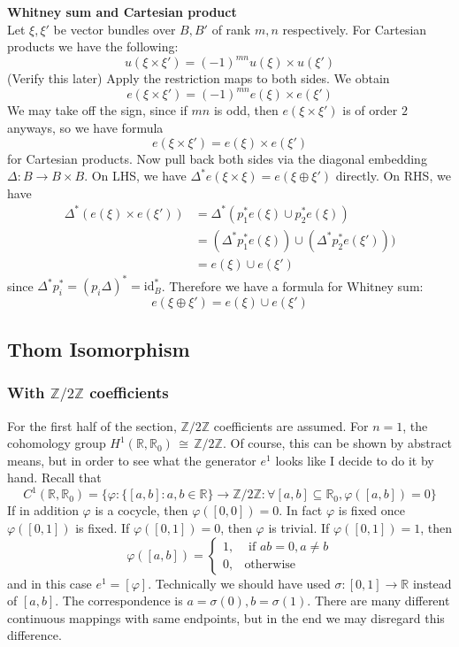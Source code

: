 \documentclass[12pt]{article}
\theoremstyle{plain}
\theoremstyle{definition}
\newcommand{\IR}{\mathbb{R}}
\newcommand{\IZ}{\mathbb{Z}}
\newcommand\iso{\,{\cong}\,}
\newcommand{\<}{\langle}
\renewcommand{\>}{\rangle}
\newcommand{\id}{\mathrm{id}}
\begin{document}
\textbf{Whitney sum and Cartesian product}\\
Let $\xi, \xi'$ be vector bundles over $B, B'$ of rank $m, n$ respectively. 
For Cartesian products we have the following:
$$ u(\xi \times \xi') = (-1)^{mn} u(\xi) \times u(\xi') $$ (Verify this later)
Apply the restriction maps to both sides. We obtain 
$$ e(\xi \times \xi') = (-1)^{mn} e(\xi) \times e(\xi')$$
We may take off the sign, since if $mn$ is odd, then $e(\xi \times \xi')$ is of order $2$ anyways, so we have formula
$$ e(\xi \times \xi') = e(\xi) \times e(\xi')$$
for Cartesian products. Now pull back both sides via the diagonal embedding $\Delta : B \to B \times B$. On LHS, we have $\Delta^* e(\xi \times \xi) = e (\xi \oplus \xi')$ directly. On RHS, we have 
\begin{align*}
\Delta^*(e(\xi) \times e(\xi')) & = \Delta^*( p_1^* e(\xi) \cup p_2^* e(\xi))\\
&= (\Delta^* p_1^* e(\xi) ) \cup (\Delta^* p_2^* e(\xi'))) \\
&= e(\xi) \cup e(\xi') 
\end{align*}
since $\Delta^* p_i^* = (p_i \Delta)^* = \id_B^*$. Therefore we have a formula for Whitney sum:
$$ e(\xi \oplus \xi') = e(\xi) \cup e(\xi')$$


\subsection{Thom Isomorphism}
\subsubsection{With $\IZ/2\IZ$ coefficients}
For the first half of the section, $\IZ/2\IZ$ coefficients are assumed.
For $n = 1$, the cohomology group $H^1(\IR, \IR_0) \iso \IZ/2\IZ$. Of course, this can be shown by abstract means, but in order to see what the generator $e^1$ looks like I decide to do it by hand. Recall that $$C^1(\IR, \IR_0)= \{ \varphi : \{ [a, b]: a, b \in \IR \} \to \IZ/2\IZ : \forall [a, b] \subseteq \IR_0, \varphi([a, b]) = 0 \}$$ If in addition $\varphi$ is a cocycle, then $\varphi([0, 0]) = 0$. In fact $\varphi$ is fixed once $\varphi([0, 1])$ is fixed. If $\varphi([0, 1]) = 0$, then $\varphi$ is trivial. If $\varphi([0, 1]) = 1$, then $$ \varphi([a, b]) = \begin{cases} 1, &\text{ if }ab = 0, a \neq b \\
 0,& \text{otherwise} \end{cases} $$ and in this case $e^1 = [\varphi]$. Technically we should have used $\sigma : [0,1] \to \IR$ instead of $[a, b]$. The correspondence is $a = \sigma(0), b = \sigma(1)$. There are many different continuous mappings with same endpoints, but in the end we may disregard this difference. 
\end{document}
